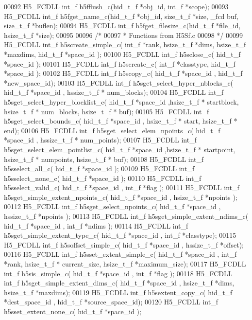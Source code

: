\begin{DoxyCode}
00092 H5\_FCDLL int\_f h5fflush\_c(hid\_t\_f *obj\_id, int\_f *scope);
00093 H5\_FCDLL int\_f h5fget\_name\_c(hid\_t\_f *obj\_id, size\_t\_f *size, \_fcd buf, size\_t\_f *buflen);
00094 H5\_FCDLL int\_f h5fget\_filesize\_c(hid\_t\_f *file\_id, hsize\_t\_f *size);
00095 
00096 \textcolor{comment}{/*}
00097 \textcolor{comment}{ * Functions from H5Sf.c}
00098 \textcolor{comment}{ */}
00099 H5\_FCDLL int\_f h5screate\_simple\_c( int\_f *rank, hsize\_t\_f *dims, hsize\_t\_f *maxdims, hid\_t\_f *space\_id );
00100 H5\_FCDLL int\_f h5sclose\_c( hid\_t\_f *space\_id );
00101 H5\_FCDLL int\_f h5screate\_c( int\_f *classtype, hid\_t\_f *space\_id );
00102 H5\_FCDLL int\_f h5scopy\_c( hid\_t\_f *space\_id , hid\_t\_f *new\_space\_id);
00103 H5\_FCDLL int\_f h5sget\_select\_hyper\_nblocks\_c( hid\_t\_f *space\_id , hssize\_t\_f * num\_blocks);
00104 H5\_FCDLL int\_f h5sget\_select\_hyper\_blocklist\_c( hid\_t\_f *space\_id ,hsize\_t\_f * startblock, hsize\_t\_f * 
      num\_blocks, hsize\_t\_f * buf);
00105 H5\_FCDLL int\_f h5sget\_select\_bounds\_c( hid\_t\_f *space\_id , hsize\_t\_f * start, hsize\_t\_f * end);
00106 H5\_FCDLL int\_f h5sget\_select\_elem\_npoints\_c( hid\_t\_f *space\_id , hssize\_t\_f * num\_points);
00107 H5\_FCDLL int\_f h5sget\_select\_elem\_pointlist\_c( hid\_t\_f *space\_id ,hsize\_t\_f * startpoint, hsize\_t\_f * 
      numpoints, hsize\_t\_f * buf);
00108 H5\_FCDLL int\_f h5sselect\_all\_c( hid\_t\_f *space\_id );
00109 H5\_FCDLL int\_f h5sselect\_none\_c( hid\_t\_f *space\_id );
00110 H5\_FCDLL int\_f h5sselect\_valid\_c( hid\_t\_f *space\_id , int\_f *flag );
00111 H5\_FCDLL int\_f h5sget\_simple\_extent\_npoints\_c( hid\_t\_f *space\_id , hsize\_t\_f *npoints );
00112 H5\_FCDLL int\_f h5sget\_select\_npoints\_c( hid\_t\_f *space\_id , hssize\_t\_f *npoints );
00113 H5\_FCDLL int\_f h5sget\_simple\_extent\_ndims\_c( hid\_t\_f *space\_id , int\_f *ndims );
00114 H5\_FCDLL int\_f h5sget\_simple\_extent\_type\_c( hid\_t\_f *space\_id , int\_f *classtype);
00115 H5\_FCDLL int\_f h5soffset\_simple\_c( hid\_t\_f *space\_id , hssize\_t\_f *offset);
00116 H5\_FCDLL int\_f h5sset\_extent\_simple\_c( hid\_t\_f *space\_id , int\_f *rank, hsize\_t\_f * current\_size, hsize\_t\_f
       *maximum\_size);
00117 H5\_FCDLL int\_f h5sis\_simple\_c( hid\_t\_f *space\_id , int\_f *flag );
00118 H5\_FCDLL int\_f h5sget\_simple\_extent\_dims\_c( hid\_t\_f *space\_id , hsize\_t\_f *dims, hsize\_t\_f *maxdims);
00119 H5\_FCDLL int\_f h5sextent\_copy\_c( hid\_t\_f *dest\_space\_id , hid\_t\_f *source\_space\_id);
00120 H5\_FCDLL int\_f h5sset\_extent\_none\_c( hid\_t\_f *space\_id );

\end{DoxyCode}

